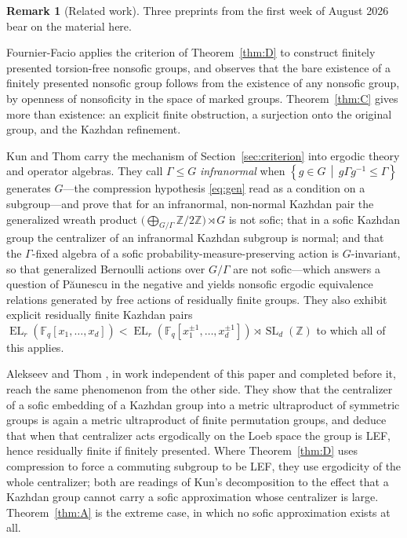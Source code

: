 \documentclass[11pt]{amsart}
\theoremstyle{definition}
\newtheorem{remark}[theorem]{Remark}
\theoremstyle{plain}
\newcommand{\F}{\mathbb F}
\newcommand{\Z}{\mathbb Z}
\newcommand{\EL}{\operatorname{EL}}
\newcommand{\set}[1]{\left\{#1\right\}}
\newcommand{\suchthat}{\,\middle|\,}
\begin{document}
\begin{remark}[Related work]\label{rem:subsequent}
Three preprints from the first week of August 2026 bear on the material here.

Fournier-Facio \cite{FournierFacio26} applies the criterion of Theorem~\ref{thm:D} to construct finitely presented torsion-free nonsofic groups, and observes that the bare existence of a finitely presented nonsofic group follows from the existence of any nonsofic group, by openness of nonsoficity in the space of marked groups.  Theorem~\ref{thm:C} gives more than existence: an explicit finite obstruction, a surjection onto the original group, and the Kazhdan refinement.

Kun and Thom \cite{KunThom26} carry the mechanism of Section~\ref{sec:criterion} into ergodic theory and operator algebras.  They call \(\Gamma\leq G\) \emph{infranormal} when \(\set{g\in G\suchthat g\Gamma g^{-1}\leq\Gamma}\) generates \(G\)---the compression hypothesis \eqref{eq:gen} read as a condition on a subgroup---and prove that for an infranormal, non-normal Kazhdan pair the generalized wreath product \(\bigl(\bigoplus_{G/\Gamma}\Z/2\Z\bigr)\rtimes G\) is not sofic; that in a sofic Kazhdan group the centralizer of an infranormal Kazhdan subgroup is normal; and that the \(\Gamma\)-fixed algebra of a sofic probability-measure-preserving action is \(G\)-invariant, so that generalized Bernoulli actions over \(G/\Gamma\) are not sofic---which answers a question of P\u aunescu in the negative and yields nonsofic ergodic equivalence relations generated by free actions of residually finite groups.  They also exhibit explicit residually finite Kazhdan pairs \(\EL_r(\F_q[x_1,\dots,x_d])<\EL_r(\F_q[x_1^{\pm1},\dots,x_d^{\pm1}])\rtimes\operatorname{SL}_d(\Z)\) to which all of this applies.

Alekseev and Thom \cite{AlekseevThom26}, in work independent of this paper and completed before it, reach the same phenomenon from the other side.  They show that the centralizer of a sofic embedding of a Kazhdan group into a metric ultraproduct of symmetric groups is again a metric ultraproduct of finite permutation groups, and deduce that when that centralizer acts ergodically on the Loeb space the group is LEF, hence residually finite if finitely presented.  Where Theorem~\ref{thm:D} uses compression to force a commuting subgroup to be LEF, they use ergodicity of the whole centralizer; both are readings of Kun's decomposition to the effect that a Kazhdan group cannot carry a sofic approximation whose centralizer is large.  Theorem~\ref{thm:A} is the extreme case, in which no sofic approximation exists at all.


\end{remark}
\end{document}
